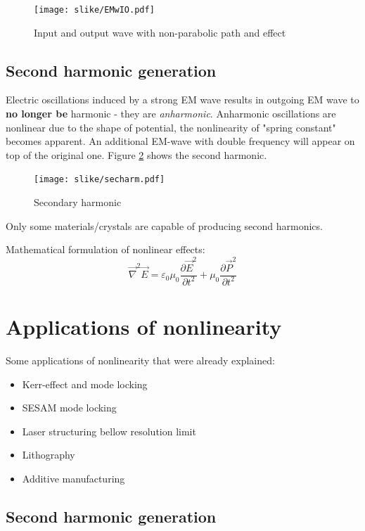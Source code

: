 \begin{figure}[h!]
    \centering
    \texttt{[image: slike/EMwIO.pdf]}
    \caption{Input and output wave with non-parabolic path and effect}
    \label{fig:EMWsw}
\end{figure}

\subsection{Second harmonic generation}

Electric oscillations induced by a strong EM wave  results in outgoing EM wave to \textbf{no longer be } harmonic - they are \textit{anharmonic}.
Anharmonic oscillations are nonlinear due to the shape of potential, the nonlinearity of "spring constant"
becomes apparent. An additional EM-wave with double frequency will appear on top of the original one. 
Figure \ref{fig:secharm} shows the second harmonic.

\begin{figure}[h!]
    \centering
    \texttt{[image: slike/secharm.pdf]}
    \caption{Secondary harmonic}
    \label{fig:secharm}
\end{figure}

Only some materials/crystals are capable of producing second harmonics.

Mathematical formulation of nonlinear effects:
\begin{equation}
    \vec{\nabla}^2 \vec{E} = \varepsilon_0 \mu_0 \frac{\partial \vec{E}^2}{\partial t^2}  + \mu_0 \frac{\partial \vec{P}^2}{\partial t^2}
\end{equation}


\section{Applications of nonlinearity}

Some applications of nonlinearity that were already explained:
\begin{itemize}
    \item Kerr-effect and mode locking
    \item SESAM mode locking
    \item Laser structuring bellow resolution limit
    \item Lithography
    \item Additive manufacturing
\end{itemize}


\subsection{Second harmonic generation}

